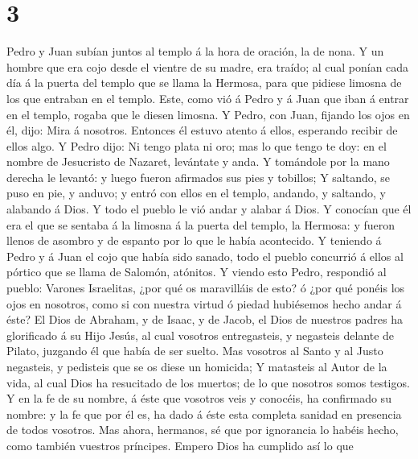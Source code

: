 \hypertarget{section-2}{%
\section{3}\label{section-2}}

 Pedro y Juan subían juntos al templo á la hora de
oración, la de nona.  Y un hombre que era cojo desde el
vientre de su madre, era traído; al cual ponían cada día á la puerta del
templo que se llama la Hermosa, para que pidiese limosna de los que
entraban en el templo.  Este, como vió á Pedro y á Juan
que iban á entrar en el templo, rogaba que le diesen limosna.
 Y Pedro, con Juan, fijando los ojos en él, dijo: Mira á
nosotros.  Entonces él estuvo atento á ellos, esperando
recibir de ellos algo.  Y Pedro dijo: Ni tengo plata ni
oro; mas lo que tengo te doy: en el nombre de Jesucristo de Nazaret,
levántate y anda.  Y tomándole por la mano derecha le
levantó: y luego fueron afirmados sus pies y tobillos;  Y
saltando, se puso en pie, y anduvo; y entró con ellos en el templo,
andando, y saltando, y alabando á Dios.  Y todo el pueblo
le vió andar y alabar á Dios.  Y conocían que él era el
que se sentaba á la limosna á la puerta del templo, la Hermosa: y fueron
llenos de asombro y de espanto por lo que le había acontecido.
 Y teniendo á Pedro y á Juan el cojo que había sido
sanado, todo el pueblo concurrió á ellos al pórtico que se llama de
Salomón, atónitos.  Y viendo esto Pedro, respondió al
pueblo: Varones Israelitas, ¿por qué os maravilláis de esto? ó ¿por qué
ponéis los ojos en nosotros, como si con nuestra virtud ó piedad
hubiésemos hecho andar á éste?  El Dios de Abraham, y de
Isaac, y de Jacob, el Dios de nuestros padres ha glorificado á su Hijo
Jesús, al cual vosotros entregasteis, y negasteis delante de Pilato,
juzgando él que había de ser suelto.  Mas vosotros al
Santo y al Justo negasteis, y pedisteis que se os diese un homicida;
 Y matasteis al Autor de la vida, al cual Dios ha
resucitado de los muertos; de lo que nosotros somos testigos.
 Y en la fe de su nombre, á éste que vosotros veis y
conocéis, ha confirmado su nombre: y la fe que por él es, ha dado á éste
esta completa sanidad en presencia de todos vosotros. 
Mas ahora, hermanos, sé que por ignorancia lo habéis hecho, como también
vuestros príncipes.  Empero Dios ha cumplido así lo que
